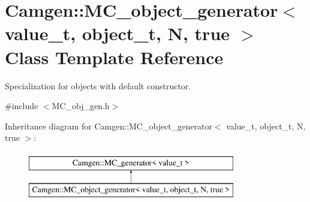 \hypertarget{a00368}{\section{Camgen\-:\-:M\-C\-\_\-object\-\_\-generator$<$ value\-\_\-t, object\-\_\-t, N, true $>$ Class Template Reference}
\label{a00368}
}


Specialization for objects with default constructor.  




{\ttfamily \#include $<$M\-C\-\_\-obj\-\_\-gen.\-h$>$}

Inheritance diagram for Camgen\-:\-:M\-C\-\_\-object\-\_\-generator$<$ value\-\_\-t, object\-\_\-t, N, true $>$\-:\begin{figure}[H]
\begin{center}
\leavevmode
\includegraphics[height=2.000000cm]{a00368}
\end{center}
\end{figure}
